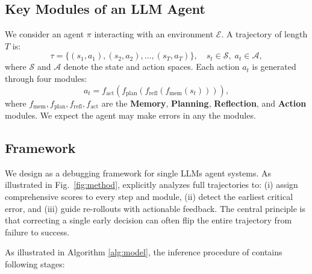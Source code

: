 \subsection{Key Modules of an LLM Agent}
We consider an agent $\pi$ interacting with an environment $\mathcal{E}$. A trajectory of length $T$ is:
\begin{equation}
    \tau = \{(s_1, a_1), (s_2, a_2), \dots, (s_T, a_T)\}, \quad s_t \in \mathcal{S},\; a_t \in \mathcal{A},
\end{equation}
where $\mathcal{S}$ and $\mathcal{A}$ denote the state and action spaces.  
Each action $a_t$ is generated through four modules:
\begin{equation}
    a_t = f_{\text{act}}\!\left(f_{\text{plan}}\!\left(f_{\text{refl}}\!\left(f_{\text{mem}}(s_t)\right)\right)\right),
\end{equation}
where $f_{\text{mem}}, f_{\text{plan}}, f_{\text{refl}}, f_{\text{act}}$ are the \textbf{Memory}, \textbf{Planning}, \textbf{Reflection}, and \textbf{Action} modules. We expect the agent may make errors in any the modules.

\subsection{\ModelName{} Framework}
\label{sec:modelname}

We design \ModelName{} as a debugging framework for single LLMs agent systems. As illustrated in Fig.~\ref{fig:method}, \ModelName{} explicitly analyzes full trajectories to:  
(i) assign comprehensive scores to every step and module,  
(ii) detect the earliest critical error, and  
(iii) guide re-rollouts with actionable feedback.  
The central principle is that correcting a single early decision can often flip the entire trajectory from failure to success.

As illustrated in Algorithm \ref{alg:model}, the inference procedure of \ModelName{} contains following stages:

